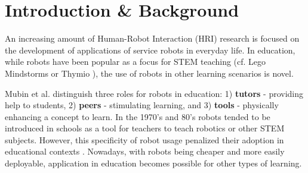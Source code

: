 \documentclass{sig-alternate-05-2015}
\begin{document}
%
%
%

%
%

%
%


\section{Introduction \& Background}
An increasing amount of Human-Robot Interaction (HRI) research is focused on the development of applications of service robots in everyday life. 
In education, while robots have been popular as a focus for STEM 
teaching (cf. Lego Mindstorms or Thymio \cite{riedo2012two}), the use of robots in other learning scenarios is novel. 

Mubin et al. \cite{mubin2013review} distinguish three roles for robots in education:
1) \textbf{tutors} - providing help to students, 2) \textbf{peers} - stimulating learning, and 3) \textbf{tools} - physically enhancing a concept to learn.
In the 1970's and 80's robots tended to be introduced in schools as a tool for teachers to teach robotics or other STEM subjects. 
However, this specificity of robot usage penalized their adoption in educational contexts \cite{gander2013informatics}.
Nowadays, with robots being cheaper and more easily deployable, application in education becomes possible for other types of learning.
\end{document}
